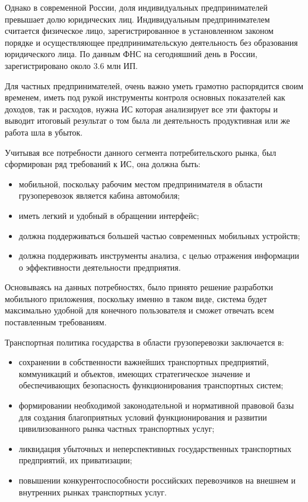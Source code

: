 \documentclass{lstu-diploma}
\begin{document}
Однако в современной России, доля индивидуальных предпринимателей превышает долю
юридических лиц.
Индивидуальным предпринимателем считается физическое лицо, зарегистрированное в
установленном законом порядке и осуществляющее предпринимательскую деятельность
без образования юридического лица. По данным ФНС на сегодняшний день в России,
зарегистрировано около 3.6 млн ИП.

Для частных предпринимателей, очень важно уметь грамотно распорядится своим
временем, иметь под рукой инструменты контроля основных показателей как доходов,
так и расходов, нужна ИС которая анализирует все эти факторы и выводит итоговый
результат о том была ли деятельность продуктивная или же работа шла в убыток.

Учитывая все потребности данного сегмента потребительского рынка, был
сформирован ряд требований к ИС, она должна быть:
\begin{itemize}
    \item мобильной, поскольку рабочим местом предпринимателя в области
		грузоперевозок является кабина автомобиля;
    \item иметь легкий и удобный в обращении интерфейс;
    \item должна поддерживаться большей частью современных мобильных устройств;
    \item должна поддерживать инструменты анализа, с целью отражения информации
		о эффективности деятельности предприятия.
\end{itemize}

Основываясь на данных потребностях, было принято решение разработки мобильного
приложения, поскольку именно в таком виде, система будет максимально удобной для
конечного пользователя и сможет отвечать всем поставленным требованиям.

Транспортная политика государства в области грузоперевозки заключается в:
\begin{itemize}
    \item сохранении в собственности важнейших транспортных предприятий,
		коммуникаций и объектов, имеющих стратегическое значение и
		обеспечивающих безопасность функционирования транспортных систем;
	\item формировании необходимой законодательной и нормативной правовой базы
		для создания благоприятных условий функционирования и развитии
		цивилизованного рынка частных транспортных услуг;
	\item ликвидация убыточных и неперспективных государственных транспортных
		предприятий, их приватизации;
	\item повышении конкурентоспособности российских перевозчиков на внешнем и
		внутренних рынках транспортных услуг.
\end{itemize}
\end{document}
